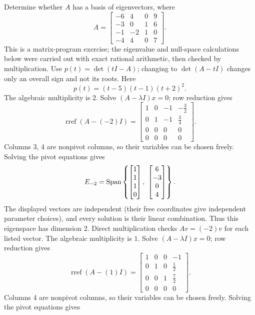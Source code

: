 \goal Determine whether $A$ has a basis of eigenvectors, where
\[A=\begin{bmatrix}-6&4&0&9\\-3&0&1&6\\-1&-2&1&0\\-4&4&0&7\end{bmatrix}.\]
This is a matrix-program exercise; the eigenvalue and null-space calculations below were carried out with exact rational arithmetic, then checked by multiplication.
Use $p(t)=\det(tI-A)$; changing to $\det(A-tI)$ changes only an overall sign and not its roots. Here
\[p(t)=\left(t - 5\right) \left(t - 1\right) \left(t + 2\right)^{2}.\]
The algebraic multiplicity is $2$. Solve $(A-\lambda I)x=0$; row reduction gives
\[\operatorname{rref}(A-(-2)I)=\begin{bmatrix}1&0&-1&- \frac{3}{2}\\0&1&-1&\frac{3}{4}\\0&0&0&0\\0&0&0&0\end{bmatrix}.\]
Columns 3, 4 are nonpivot columns, so their variables can be chosen freely. Solving the pivot equations gives
\[E_{-2}=\Span\left\{\begin{bmatrix}1\\1\\1\\0\end{bmatrix},\ \begin{bmatrix}6\\-3\\0\\4\end{bmatrix}\right\}.\]
The displayed vectors are independent (their free coordinates give independent parameter choices), and every solution is their linear combination. Thus this eigenspace has dimension $2$. Direct multiplication checks $Av=(-2)v$ for each listed vector.
The algebraic multiplicity is $1$. Solve $(A-\lambda I)x=0$; row reduction gives
\[\operatorname{rref}(A-(1)I)=\begin{bmatrix}1&0&0&-1\\0&1&0&\frac{1}{2}\\0&0&1&\frac{7}{2}\\0&0&0&0\end{bmatrix}.\]
Columns 4 are nonpivot columns, so their variables can be chosen freely. Solving the pivot equations gives
